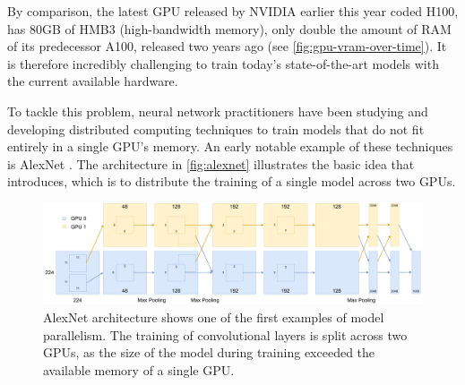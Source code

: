 By comparison, the latest GPU released by NVIDIA earlier this year coded H100, has 80GB of HMB3 (high-bandwidth memory), only double the amount of RAM of its predecessor A100, released two years ago (see \autoref{fig:gpu-vram-over-time}).
It is therefore incredibly challenging to train today's state-of-the-art models with the current available hardware.

To tackle this problem, neural network practitioners have been studying and developing distributed computing techniques to train models that do not fit entirely in a single GPU's memory.
An early notable example of these techniques is AlexNet \cite{alexnet2012}. The architecture in \autoref{fig:alexnet} illustrates the basic idea that \cite{alexnet2012} introduces, which is to distribute the training of a single model across two GPUs.

\begin{figure}[h]
    \caption{AlexNet \cite{alexnet2012} architecture shows one of the first examples of model parallelism. The training of convolutional layers is split across two GPUs, as the size of the model during training exceeded the available memory of a single GPU.}
    \label{fig:alexnet}
    \includegraphics[width=\textwidth]{./figures/alexnet.pdf}
\end{figure}
